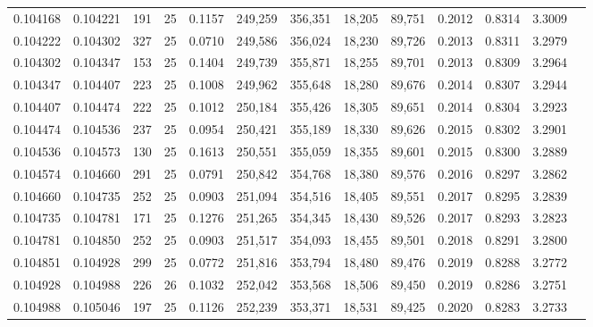 \begin{tabular}{rrrrrrrrrrrrr}
0.104168 & 0.104221 &   191 &  25 &                                     0.1157 & 249,259 & 356,351 &  18,205 &  89,751 & 0.2012 & 0.8314 & 3.3009 \\
0.104222 & 0.104302 &   327 &  25 &                                     0.0710 & 249,586 & 356,024 &  18,230 &  89,726 & 0.2013 & 0.8311 & 3.2979 \\
0.104302 & 0.104347 &   153 &  25 &                                     0.1404 & 249,739 & 355,871 &  18,255 &  89,701 & 0.2013 & 0.8309 & 3.2964 \\
0.104347 & 0.104407 &   223 &  25 &                                     0.1008 & 249,962 & 355,648 &  18,280 &  89,676 & 0.2014 & 0.8307 & 3.2944 \\
0.104407 & 0.104474 &   222 &  25 &                                     0.1012 & 250,184 & 355,426 &  18,305 &  89,651 & 0.2014 & 0.8304 & 3.2923 \\
0.104474 & 0.104536 &   237 &  25 &                                     0.0954 & 250,421 & 355,189 &  18,330 &  89,626 & 0.2015 & 0.8302 & 3.2901 \\
0.104536 & 0.104573 &   130 &  25 &                                     0.1613 & 250,551 & 355,059 &  18,355 &  89,601 & 0.2015 & 0.8300 & 3.2889 \\
0.104574 & 0.104660 &   291 &  25 &                                     0.0791 & 250,842 & 354,768 &  18,380 &  89,576 & 0.2016 & 0.8297 & 3.2862 \\
0.104660 & 0.104735 &   252 &  25 &                                     0.0903 & 251,094 & 354,516 &  18,405 &  89,551 & 0.2017 & 0.8295 & 3.2839 \\
0.104735 & 0.104781 &   171 &  25 &                                     0.1276 & 251,265 & 354,345 &  18,430 &  89,526 & 0.2017 & 0.8293 & 3.2823 \\
0.104781 & 0.104850 &   252 &  25 &                                     0.0903 & 251,517 & 354,093 &  18,455 &  89,501 & 0.2018 & 0.8291 & 3.2800 \\
0.104851 & 0.104928 &   299 &  25 &                                     0.0772 & 251,816 & 353,794 &  18,480 &  89,476 & 0.2019 & 0.8288 & 3.2772 \\
0.104928 & 0.104988 &   226 &  26 &                                     0.1032 & 252,042 & 353,568 &  18,506 &  89,450 & 0.2019 & 0.8286 & 3.2751 \\
0.104988 & 0.105046 &   197 &  25 &                                     0.1126 & 252,239 & 353,371 &  18,531 &  89,425 & 0.2020 & 0.8283 & 3.2733 \\

\end{tabular}
